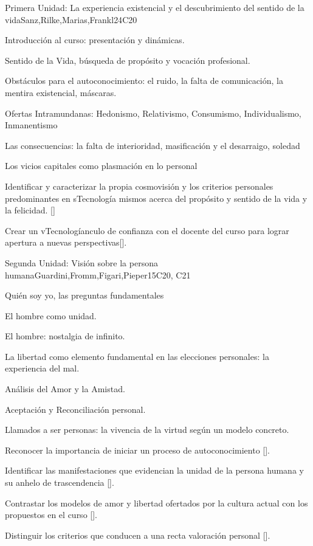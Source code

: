\begin{syllabus}
\begin{unit}{}{Primera Unidad: La experiencia existencial y el descubrimiento del sentido de la vida}{Sanz,Rilke,Marias,Frankl}{24}{C20}
\begin{topics}
	\item Introducción al curso: presentación y dinámicas.
	\item Sentido de la Vida, búsqueda de propósito y vocación profesional.
	\item Obstáculos para el autoconocimiento: el ruido, la falta de comunicación, la mentira existencial, máscaras.
	\item Ofertas Intramundanas: Hedonismo, Relativismo, Consumismo, Individualismo, Inmanentismo
	\item Las consecuencias: la falta de interioridad, masificación y el desarraigo, soledad
	\item Los vicios capitales como plasmación en lo personal
\end{topics}
\begin{learningoutcomes}
	\item Identificar y caracterizar la propia cosmovisión y los criterios personales predominantes en sTecnología mismos acerca del propósito y sentido de la vida y la felicidad. [\Usage]
	\item Crear un vTecnologíanculo de confianza con el docente del curso para lograr apertura a nuevas perspectivas[\Usage].
\end{learningoutcomes}
\end{unit}

\begin{unit}{}{Segunda Unidad: Visión sobre la persona humana}{Guardini,Fromm,Figari,Pieper}{15}{C20, C21}
\begin{topics}
	\item Quién soy yo, las preguntas fundamentales
	\item El hombre como unidad.
	\item El hombre: nostalgia de infinito.
	\item La libertad como elemento fundamental en las elecciones personales: la experiencia del mal.
	\item Análisis del Amor y la Amistad.
	\item Aceptación y Reconciliación personal.
    \item Llamados a ser personas: la vivencia de la virtud según un modelo concreto.
\end{topics}
\begin{learningoutcomes}
	\item Reconocer la importancia de iniciar un proceso de autoconocimiento [\Usage].
	\item Identificar las manifestaciones que evidencian la unidad de la persona humana y su anhelo de trascendencia [\Usage].
    \item Contrastar los modelos de amor y libertad ofertados por la cultura actual con los propuestos en el curso [\Usage].
    \item Distinguir los criterios que conducen a una recta valoración personal [\Usage].
\end{learningoutcomes}
\end{unit}


\end{syllabus}
